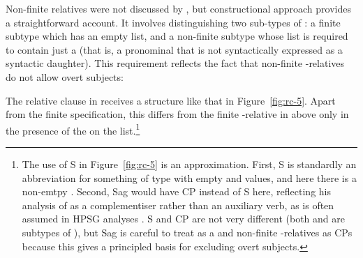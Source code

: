 \documentclass[output=paper
                ,modfonts
                ,nonflat
	        ,collection
	        ,collectionchapter
	        ,collectiontoclongg
 	        ,biblatex
                ,babelshorthands
                ,newtxmath
                ,draftmode
                ,colorlinks, citecolor=brown
]{./langsci/langscibook}
\begin{document}
Non-finite relatives were not discussed by \cite{Pollard:Sag:94}, but 
constructional approach provides a straightforward account. It involves
distinguishing two sub-types of : a finite subtype which has an empty
 list, and a non-finite subtype whose  list is required to contain
just a  (that is, a pronominal that is not syntactically expressed as a
syntactic daughter). This requirement reflects the fact that non-finite
-relatives do not allow overt subjects:
\begin{exe}
\end{exe}
The relative clause in  receives a structure like that in
Figure~\ref{fig:rc-5}. Apart from the finite specification, this differs from the finite
-relative in  above only in the presence of the  on the
 list.\footnote{The use of S in Figure~\ref{fig:rc-5} is an
  approximation. First, S is standardly an abbreviation for something of type
   with empty  and \comps values,
  and here there is a non-emtpy . Second, Sag would have CP instead of S here,
  reflecting his analysis of  as a complementiser rather than an auxiliary verb,
  as is often assumed in HPSG analyses \citep[e.g.][51--52]{Ginzburg:Sag:00}. S and CP are
  not very different (both  and  are
  subtypes of ), but Sag is careful to treat  as a
   and non-finite -relatives as CPs because this gives a
  principled basis for excluding overt subjects.}
\end{document}
